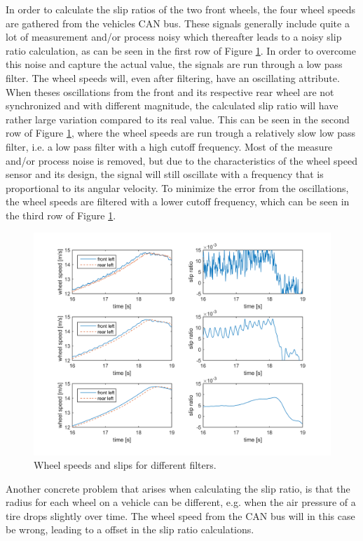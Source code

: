 In order to calculate the slip ratios of the two front wheels, the four wheel speeds are gathered from the vehicles CAN bus. These signals generally include quite a lot of measurement and/or process noisy which thereafter leads to a noisy slip ratio calculation, as can be seen in the first row of Figure \ref{wheel_speed_and_slip}. In order to overcome this noise and capture the actual value, the signals are run through a low pass filter. The wheel speeds will, even after filtering, have an oscillating attribute. When theses oscillations from the front and its respective rear wheel are not synchronized and with different magnitude, the calculated slip ratio will have rather large variation compared to its real value. This can be seen in the second row of Figure \ref{wheel_speed_and_slip}, where the wheel speeds are run trough a relatively slow low pass filter, i.e. a low pass filter with a high cutoff frequency. Most of the measure and/or process noise is removed, but due to the characteristics of the wheel speed sensor and its design, the signal will still oscillate with a frequency that is proportional to its angular velocity. To minimize the error from the oscillations, the wheel speeds are filtered with a lower cutoff frequency, which can be seen in the third row of Figure \ref{wheel_speed_and_slip}. 
\begin{figure}[h]
	\centering
	\includegraphics[width=1.0\textwidth]{Pictures/wheel_speed_and_slip}
	\caption {Wheel speeds and slips for different filters.}
	\label{wheel_speed_and_slip}
\end{figure}
Another concrete problem that arises when calculating the slip ratio, is that the radius for each wheel on a vehicle can be different, e.g. when the air pressure of a tire drops slightly over time. The wheel speed from the CAN bus will in this case be wrong, leading to a offset in the slip ratio calculations. 

